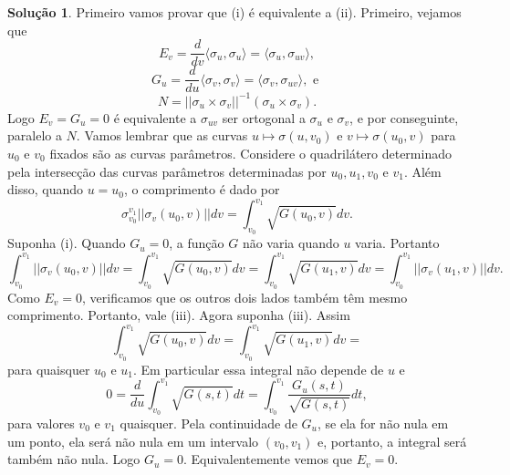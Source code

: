 \documentclass[a4paper,12pt]{article}
\theoremstyle{exer}
\theoremstyle{definition}
\newtheorem{solution}{Solução}
\theoremstyle{plain}
\begin{document}
\begin{solution}
    Primeiro vamos provar que (i) é equivalente a (ii). Primeiro, vejamos que 
    $$
    E_v = \frac{d}{dv}\langle \sigma_u, \sigma_u \rangle = \langle \sigma_u, \sigma_{uv} \rangle,
    $$
    $$
    G_u = \frac{d}{du}\langle \sigma_v, \sigma_v \rangle = \langle \sigma_v, \sigma_{uv} \rangle, \text{ e }
    $$
    $$
    N = ||\sigma_u \times \sigma_v||^{-1}(\sigma_u \times \sigma_v).
    $$
    Logo $E_v = G_u = 0$ é equivalente a $\sigma_{uv}$ ser ortogonal a
    $\sigma_u$ e $\sigma_v$, e por conseguinte, paralelo a $N$.  Vamos lembrar
    que as curvas $u \mapsto \sigma(u, v_0)$ e $v \mapsto \sigma(u_0, v)$ para
    $u_0$ e $v_0$ fixados são as curvas parâmetros. Considere o quadrilátero
    determinado pela intersecção das curvas parâmetros determinadas por $u_0,
    u_1, v_0$ e $v_1$. Além disso, quando $u = u_0$, o comprimento é dado por 
    $$
    \sigma_{v_0}^{v_1} ||\sigma_v(u_0, v)|| dv = \int_{v_0}^{v_1} \sqrt{G(u_0, v)}dv.
    $$
    Suponha (i). Quando $G_u = 0$, a função $G$ não varia quando $u$ varia.
    Portanto 
    $$
    \int_{v_0}^{v_1} ||\sigma_v(u_0, v)|| dv = \int_{v_0}^{v_1} \sqrt{G(u_0, v)}dv =
    \int_{v_0}^{v_1} \sqrt{G(u_1, v)}dv = 
    \int_{v_0}^{v_1} ||\sigma_v(u_1, v)|| dv.
    $$
    Como $E_v = 0$, verificamos que os outros dois lados também têm mesmo
    comprimento. Portanto, vale (iii). Agora suponha (iii). Assim 
    $$
    \int_{v_0}^{v_1} \sqrt{G(u_0, v)}dv =
    \int_{v_0}^{v_1} \sqrt{G(u_1, v)}dv = 
    $$
    para quaisquer $u_0$ e $u_1$. Em particular essa integral não depende de
    $u$ e 
    $$
    0 = \frac{d}{du} \int_{v_0}^{v_1} \sqrt{G(s, t)}dt = \int_{v_0}^{v_1} \frac{G_u(s,t)}{\sqrt{G(s,t)}}dt, 
    $$
    para valores $v_0$ e $v_1$ quaisquer. Pela continuidade de $G_u$, se ela
    for não nula em um ponto, ela será não nula em um intervalo $(v_0,v_1)$ e,
    portanto, a integral será também não nula. Logo $G_u = 0$.
    Equivalentemente vemos que $E_v = 0$. 


\end{solution}
\end{document}
